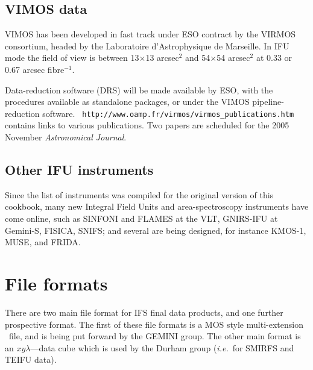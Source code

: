 \documentclass[twoside,11pt]{article}
\newcommand{\htmladdnormallink}[2]{#1}
\newcommand{\htmlref}[2]{#1}
\newcommand{\xlabel}[1]{}
\begin{document}
\subsection{\xlabel{sc16_vimos}VIMOS data\label{sc16_vimos}}

\htmladdnormallink{VIMOS}{http://www.eso.org/instruments/vimos/} has
been developed in fast track under ESO contract by the VIRMOS
consortium, headed by the Laboratoire d'Astrophysique de Marseille. In
IFU mode the field of view is between 13$\times$13 arcsec$^2$ and
54$\times$54 arcsec$^2$ at 0.33 or 0.67 arcsec fibre$^{-1}$.

Data-reduction software (DRS) will be made available by ESO, with the
procedures available as standalone packages, or under the VIMOS
pipeline-reduction software.\goodbreak
\htmladdnormallink{{\tt
http://www.oamp.fr/virmos/virmos\_publications.htm}}{http://www.oamp.fr/virmos/virmos_publications.htm}
contains links to various publications.  Two papers are scheduled for
the 2005 November {\em Astronomical Journal}.

\subsection{\xlabel{sc16_other}Other IFU instruments\label{sc16_other}}

Since the list of instruments was compiled for the original version of
this cookbook, many new Integral Field Units and area-spectroscopy
instruments have come online, such as
\htmladdnormallink{SINFONI}{http://www.eso.org/instruments/sinfoni/}
and \htmladdnormallink{FLAMES}{http://www.eso.org/instruments/flames/}
at the VLT,
\htmladdnormallink{GNIRS-IFU}{http://www.gemini.edu/sciops/instruments/nirs/nirsIndex.html}
at Gemini-S,
\htmladdnormallink{FISICA}{http://www.ctio.noao.edu/diroff/TALKS_PDF/Eikenberry_fisica_ctio05.pdf},
SNIFS; and several are being designed, for instance
\htmladdnormallink{KMOS-1}{http://www.cfai.dur.ac.uk/fix/projects/kmos1/kmos_main.html},
\htmladdnormallink{MUSE}{http://www.cfai.dur.ac.uk/fix/projects/muse/muse.html},
and FRIDA.

\newpage
\section{\xlabel{sc16_fileformat}File formats\label{sc16_fileformat}}

There are two main file format for IFS final data products, and one
further prospective format.  The \htmlref{first}{sc16_gmosfile} of
these file formats is a MOS style multi-extension 
\FITSref\ file, and is
being put forward by the GEMINI group.  The other main format is an
$xy\lambda$---\htmlref{data cube}{sc16_teifufile} which is used by the
Durham group (\emph{i.e.}\ for SMIRFS and TEIFU data).
\end{document}
